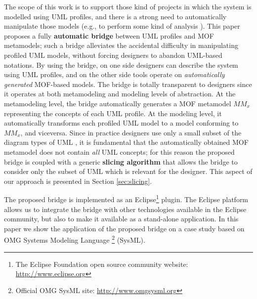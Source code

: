 The scope of this work is to support those kind of projects in which the system is modelled using UML profiles, and there is a strong need to 
automatically manipulate those models (e.g., to perform some kind of analysis \cite{cite}).
This paper proposes a fully \textbf{automatic bridge} between UML profiles and MOF metamodels; such a bridge alleviates the accidental difficulty in manipulating profiled UML models, without forcing designers to abandon UML-based notations.
By using the bridge, on one side designers can describe the system using UML profiles, and on the other side tools operate
on \textit{automatically generated} MOF-based models.
The bridge is totally transparent to designers since it operates at both metamodeling and modeling levels of abstraction.
At the metamodeling level, the bridge automatically generates a MOF metamodel $MM_x$ representing the concepts of each UML profile.
At the modeling level, it automatically transforms each profiled UML model to a model conforming to $MM_x$, and viceversa.
Since in practice designers use only a small subset of the diagram types of UML \cite{france}, 
it is fundamental that the automatically obtained MOF metamodel does not contain \textit{all} UML concepts;
for this reason the proposed bridge is coupled with a generic \textbf{slicing algorithm} that allows the bridge to consider only the subset of UML which is relevant for the designer. This aspect of our approach is presented in Section \ref{sec:slicing}. 

The proposed bridge is implemented as an Eclipse\footnote{The Eclipse Foundation open source community website: 
\small{\url{http://www.eclipse.org}}} plugin. The Eclipse platform allows us to integrate the bridge 
with other technologies available in the Eclipse community, but also to make it available as a stand-alone application.
In this paper we show the application of the proposed bridge on a case study based on OMG Systems Modeling Language
\footnote{Official OMG SysML site: \small{\url{http://www.omgsysml.org}}} (SysML).

